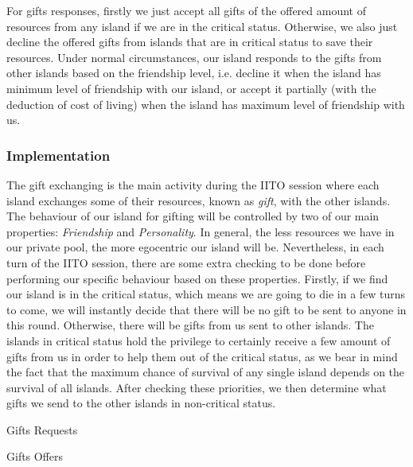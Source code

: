 For gifts responses, firstly we just accept all gifts of the offered amount of resources from any island if we are in the critical status. Otherwise, we also just decline the offered gifts from islands that are in critical status to save their resources. Under normal circumstances, our island responds to the gifts from other islands based on the friendship level, i.e. decline it when the island has minimum level of friendship with our island, or accept it partially (with the deduction of cost of living) when the island has maximum level of friendship with us.

\subsubsection{Implementation} \label{subsubsec:Team6_IITO:Implementation}
The gift exchanging is the main activity during the IITO session where each island exchanges some of their resources, known as \emph{gift}, with the other islands. The behaviour of our island for gifting will be controlled by two of our main properties: \emph{Friendship} and \emph{Personality}. In general, the less resources we have in our private pool, the more egocentric our island will be. Nevertheless, in each turn of the IITO session, there are some extra checking to be done before performing our specific behaviour based on these properties. Firstly, if we find our island is in the critical status, which means we are going to die in a few turns to come, we will instantly decide that there will be no gift to be sent to anyone in this round. Otherwise, there will be gifts from us sent to other islands. The islands in critical status hold the privilege to certainly receive a few amount of gifts from us in order to help them out of the critical status, as we bear in mind the fact that the maximum chance of survival of any single island depends on the survival of all islands. After checking these priorities, we then determine what gifts we send to the other islands in non-critical status.
\begin{algorithm}[!h]
\SetAlgoLined
    \caption{Gifts Requests}
\end{algorithm}

\begin{algorithm}[!h]
\SetAlgoLined
    \caption{Gifts Offers}
\end{algorithm}


